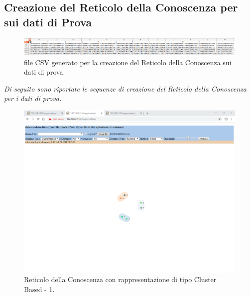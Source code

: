 \subsection{Creazione del Reticolo della Conoscenza per sui dati di Prova}
\label{Creazione del Reticolo della Conoscenza per sui dati di Prova}
\noindent
\begin{figure}[H]
\centering
	\includegraphics[width=1\linewidth]{./image/fileCSV_rete-prova.png}
	\caption{file CSV generato per la creazione del Reticolo della Conoscenza sui dati di prova.}
	\label{file CSV generato per la creazione del Reticolo della Conoscenza sui dati di prova.}
\end{figure}
\noindent
\textit{Di seguito sono riportate le sequenze di creazione del Reticolo della Conoscenza per i dati di prova.}
\noindent
\begin{figure}[H]
\centering
	\includegraphics[width=1\linewidth]{./image/reticoloCorretto1.png}
	\caption{Reticolo della Conoscenza con rappresentazione di tipo Cluster Based - 1.}
	\label{Reticolo della Conoscenza con rappresentazione di tipo Cluster Based - 1.}
\end{figure}
\noindent
